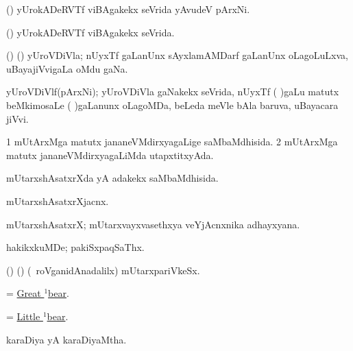 \bentry
{} 
\gl{\nA}
\expl{}
\bmng
(\pArxvi) yUrokADeRVTf viBAgakekx seVrida yAvudeV pArxNi. 
\emng
\eentry

\bentry
{} 
\gl{\gu}
\expl{}
\bmng
(\pArxvi) yUrokADeRVTf viBAgakekx seVrida. 
\emng
\eentry

\bentry
{} 
\gl{\nA}
\expl{}
\bmng
(\bava) (\pArxvi) yUroVDiVla; nUyxTf gaLanUnx sAyxlamAMDarf  gaLanUnx oLagoLuLxva, uBayajiVvigaLa oMdu gaNa. 
\emng
\eentry

\bentry
{} 
\gl{\nA}
\expl{}
\bmng
yUroVDiVlf(pArxNi); yUroVDiVla gaNakekx seVrida, nUyxTf ( )gaLu matutx beMkimosaLe ( )gaLanunx oLagoMDa, beLeda meVle bAla baruva, uBayacara jiVvi. 
\emng
\eentry

\bentry
{} 
\gl{\gu}
\expl{}
\bmng
\bnum
\num{1} mUtArxMga matutx jananeVMdirxyagaLige saMbaMdhisida. 
\num{2} mUtArxMga matutx jananeVMdirxyagaLiMda utapxtitxyAda. 
\enum
\emng
\eentry

\bentry
{} 
\gl{\gu}
\expl{}
\bmng
mUtarxshAsatxrXda yA adakekx saMbaMdhisida. 
\emng
\eentry

\bentry
{} 
\gl{\nA}
\expl{}
\bmng
mUtarxshAsatxrXjacnx. 
\emng
\eentry

\bentry
{} 
\gl{\nA}
\expl{}
\bmng
mUtarxshAsatxrX; mUtarxvayxvasethxya veYjAcnxnika adhayxyana. 
\emng
\eentry

\bentry
{} 
\gl{\nA}
\expl{}
\bmng
hakikxkuMDe; pakiSxpaqSaThx. 
\emng
\eentry

\bentry
{} 
\gl{\nA}
\expl{}
\bmng
(\veYshA) (\ca) (\kanmu\ roVganidAnadalilx) mUtarxpariVkeSx. 
\emng
\eentry

\bentry
{}
\gl{\nA}
\expl{}
\bmng
= \hyperref{kandict_b.pdf}{B}{bear(1) pagu(1)}{Great $^1$bear}. 
\emng
\eentry

\bentry
{}
\gl{\nA}
\expl{}
\bmng
= \hyperref{kandict_b.pdf}{B}{bear(1) pagu(2)}{Little $^1$bear}. 
\emng
\eentry

\bentry 
{} 
\gl{\gu}
\bmng
karaDiya yA karaDiyaMtha. 
\emng
\eentry

